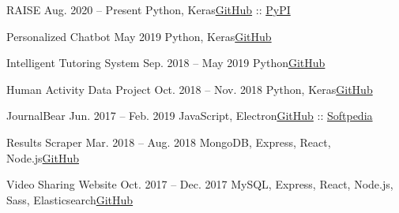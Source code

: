     \ifml
    \resumeSubheading
      {RAISE \python}{Aug. 2020 -- Present}
      {Python, Keras}{\href{https://github.com/yrahul3910/raise}{GitHub} :: \href{https://pypi.org/project/raise-utils/}{PyPI}}
    \fi
    
    \ifml
    \resumeSubheading
      {Personalized Chatbot \python}{May 2019}
      {Python, Keras}{\href{https://github.com/yrahul3910/gpt-2}{GitHub}}
    \fi
    
    \ifml
    \resumeSubheading
      {Intelligent Tutoring System \python}{Sep. 2018 -- May 2019}
      {Python}{\href{https://github.com/yrahul3910/student-modeling-project}{GitHub}}
    \fi
      
    \ifml
    \resumeSubheading
      {Human Activity Data Project \python}{Oct. 2018 -- Nov. 2018}
      {Python, Keras}{\href{https://github.com/yrahul3910/ActivityDataProject}{GitHub}}
    \fi
    
    \ifdesktop
    \resumeSubheading
      {JournalBear \python}{Jun. 2017 -- Feb. 2019}
      {JavaScript, Electron}{\href{https://github.com/yrahul3910/journal}{GitHub}  :: \href{https://www.softpedia.com/get/Office-tools/Diary-Organizers-Calendar/JournalBear.shtml}{Softpedia}}
    \fi
    
    \ifwebdev
    \resumeSubheading
      {Results Scraper \javascript}{Mar. 2018 -- Aug. 2018}
      {MongoDB, Express, React, Node.js}{\href{https://github.com/yrahul3910/results-scraper-node}{GitHub}}
    \fi
      
    \ifwebdev
    \resumeSubheading
      {Video Sharing Website \javascript}{Oct. 2017 -- Dec. 2017}
      {MySQL, Express, React, Node.js, Sass, Elasticsearch}{\href{https://github.com/yrahul3910/video-sharing-site}{GitHub}}
    \fi
      
